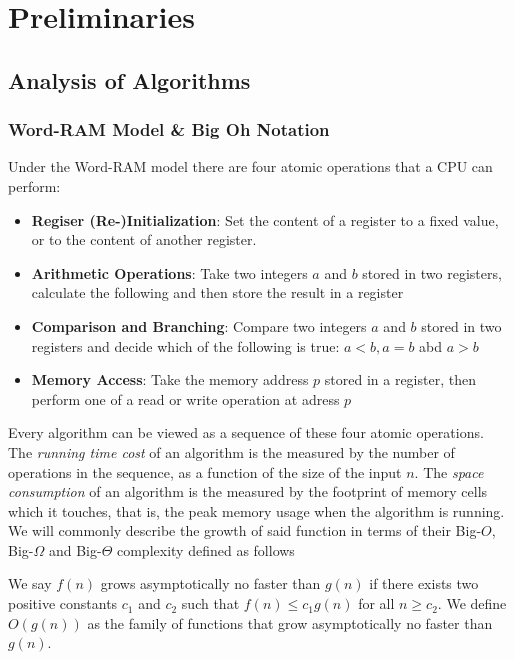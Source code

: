 \clearpage

\def\chaptertitle{Preliminaries}

\lhead{\emph{\chaptertitle}}

\chapter{\chaptertitle}
\label{ch:preliminaries}

\section{Analysis of Algorithms}
\label{sec:anaylsis-of-algorithms}

\subsection{Word-RAM Model \& Big Oh Notation}
Under the Word-RAM model there are four atomic operations that a CPU can perform: 
\begin{itemize}
    \item \textbf{Regiser (Re-)Initialization}: Set the content of a register to a fixed value, or to the content of another register.
    \item \textbf{Arithmetic Operations}: Take two integers $a$ and $b$ stored in two registers, calculate the following and then store the result in a register
    \item \textbf{Comparison and Branching}: Compare two integers $a$ and $b$ stored in two registers and decide which of the following is true: $a<b, a=b$ abd $a>b$
    \item \textbf{Memory Access}: Take the memory address $p$ stored in a register, then perform one of a read or write operation at adress $p$
\end{itemize}

Every algorithm can be viewed as a sequence of these four atomic operations. The \textit{running time cost} of an algorithm is the measured by the number of operations in the sequence, as a function of the size of the input $n$. The \textit{space consumption} of an algorithm is the measured by the footprint of memory cells which it touches, that is, the peak memory usage when the algorithm is running. We will commonly describe the growth of said function in terms of their Big-$O$, Big-$\Omega$ and Big-$\Theta$ complexity defined as follows

\begin{definition}
    We say $f(n)$ grows asymptotically no faster than $g(n)$ if there exists two positive constants $c_1$ and $c_2$ such that $f(n)\leq c_1 g(n)$ for all $n\geq c_2$. We define $O(g(n))$ as the family of functions that grow asymptotically no faster than $g(n)$.
\end{definition}

